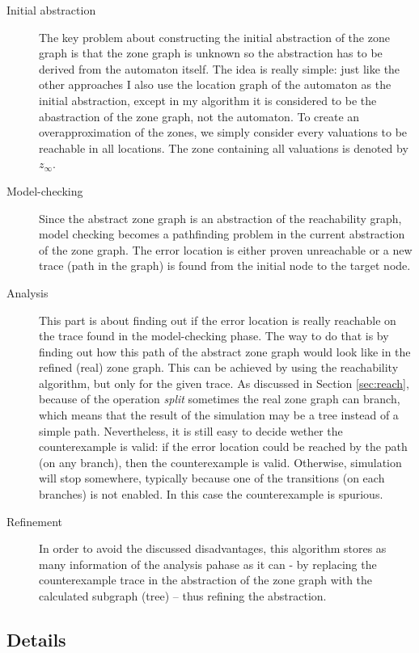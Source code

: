  \begin{description}
 	\item[Initial abstraction] The key problem about constructing the initial abstraction of the zone graph is that the zone graph is unknown so the abstraction has to be derived from the automaton itself. The idea is really simple: just like the other approaches I also use the location graph of the automaton as the initial abstraction, except in my algorithm it is considered to be the abastraction of the zone graph, not the automaton. To create an overapproximation of the zones, we simply consider every valuations to be reachable in all locations. The zone containing all valuations is denoted by $z_\infty$.
 	\item[Model-checking] Since the abstract zone graph is an abstraction of the reachability graph, model checking becomes a pathfinding problem in the current abstraction of the zone graph. The error location is either proven unreachable or a new trace (path in the graph) is found from the initial node to the target node.
 	\item[Analysis] This part is about finding out if the error location is really reachable on the trace found in the model-checking phase. The way to do that is by finding out how this path of the abstract zone graph would look like in the refined (real) zone graph. This can be achieved by using the reachability algorithm, but only for the given trace. As discussed in Section \ref{sec:reach}, because of the operation \emph{split} sometimes the real zone graph can branch, which means that the result of the simulation may be a tree instead of a simple path. Nevertheless, it is still easy to decide wether the counterexample is valid: if the error location could be reached by the path (on any branch), then the counterexample is valid. Otherwise, simulation will stop somewhere, typically because one of the transitions (on each branches) is not enabled. In this case the counterexample is spurious.
 	\item[Refinement] In order to avoid the discussed disadvantages, this algorithm stores as many information of the analysis pahase as it can - by replacing the counterexample trace in the abstraction of the zone graph with the calculated subgraph (tree) -- thus refining the abstraction.
 \end{description}

 
\subsection{Details}

